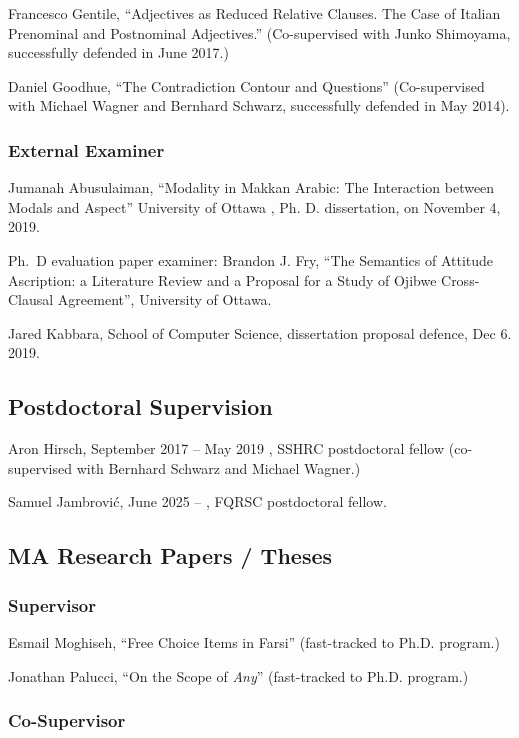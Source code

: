 \documentclass[11pt]{article}
\begin{document}
Francesco Gentile,  ``Adjectives as Reduced Relative Clauses. The Case of Italian Prenominal and Postnominal Adjectives.'' (Co-supervised with Junko Shimoyama, successfully defended in June 2017.)

Daniel Goodhue, ``The Contradiction Contour and Questions''
(Co-supervised with Michael Wagner and Bernhard Schwarz, successfully
defended in May 2014).

\subsubsection*{External Examiner}

Jumanah Abusulaiman, “Modality in Makkan Arabic: The Interaction between Modals and Aspect” University of Ottawa , Ph. D. dissertation, on November 4, 2019.

Ph.\ D evaluation paper examiner: Brandon J. Fry, ``The Semantics of Attitude Ascription: a Literature Review and a Proposal for a Study of Ojibwe Cross-Clausal Agreement'', University of Ottawa.

Jared Kabbara, School of Computer Science, dissertation proposal defence, Dec 6. 2019.


\subsection*{Postdoctoral Supervision}

Aron Hirsch, September 2017 -- May 2019 , SSHRC postdoctoral fellow (co-supervised with Bernhard Schwarz and Michael Wagner.)

Samuel Jambrovi\'c, June 2025 -- , FQRSC postdoctoral fellow.

\subsection*{MA Research Papers / Theses}

\subsubsection*{Supervisor}

Esmail Moghiseh, ``Free Choice Items in Farsi'' (fast-tracked to Ph.D. program.)

Jonathan Palucci, ``On the Scope of \textit{Any}'' (fast-tracked to Ph.D. program.)

\subsubsection*{Co-Supervisor}
\end{document}
